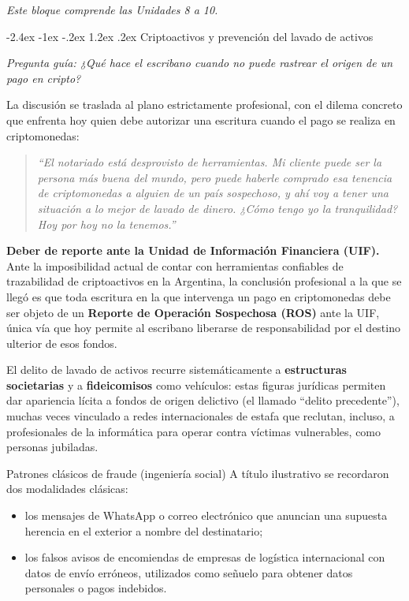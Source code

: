 \documentclass[12pt,oneside]{book}
\makeatletter
\renewcommand\section{\@startsection{section}{1}{\z@}%
  {-2.4ex \@plus -1ex \@minus -.2ex}%
  {1.2ex \@plus .2ex}%
  {\normalfont\Large\bfseries\color{blue!50!black}}}
\newcommand{\guia}[1]{\noindent\textit{Pregunta guía: #1}\par\smallskip}
\newcommand{\alcance}[1]{\noindent\textit{#1}\par\smallskip}
\makeatother
\begin{document}
\alcance{Este bloque comprende las Unidades 8 a 10.}

\section{Criptoactivos y prevención del lavado de activos}

\guia{¿Qué hace el escribano cuando no puede rastrear el origen de un pago en cripto?}

La discusión se traslada al plano estrictamente profesional, con el dilema concreto que enfrenta hoy quien debe autorizar una escritura cuando el pago se realiza en criptomonedas:

\begin{quote}
\textit{``El notariado está desprovisto de herramientas. Mi cliente puede ser la persona más buena del mundo, pero puede haberle comprado esa tenencia de criptomonedas a alguien de un país sospechoso, y ahí voy a tener una situación a lo mejor de lavado de dinero. ¿Cómo tengo yo la tranquilidad? Hoy por hoy no la tenemos.''}
\end{quote}

\begin{important}
\textbf{Deber de reporte ante la Unidad de Información Financiera (UIF).} Ante la imposibilidad actual de contar con herramientas confiables de trazabilidad de criptoactivos en la Argentina, la conclusión profesional a la que se llegó es que toda escritura en la que intervenga un pago en criptomonedas debe ser objeto de un \textbf{Reporte de Operación Sospechosa (ROS)} ante la UIF, única vía que hoy permite al escribano liberarse de responsabilidad por el destino ulterior de esos fondos.
\end{important}

El delito de lavado de activos recurre sistemáticamente a \textbf{estructuras societarias} y a \textbf{fideicomisos} como vehículos: estas figuras jurídicas permiten dar apariencia lícita a fondos de origen delictivo (el llamado ``delito precedente''), muchas veces vinculado a redes internacionales de estafa que reclutan, incluso, a profesionales de la informática para operar contra víctimas vulnerables, como personas jubiladas.

\begin{example}{Patrones clásicos de fraude (ingeniería social)}
A título ilustrativo se recordaron dos modalidades clásicas:
\begin{itemize}
    \item los mensajes de WhatsApp o correo electrónico que anuncian una supuesta herencia en el exterior a nombre del destinatario;
    \item los falsos avisos de encomiendas de empresas de logística internacional con datos de envío erróneos, utilizados como señuelo para obtener datos personales o pagos indebidos.
\end{itemize}
\end{example}
\end{document}
